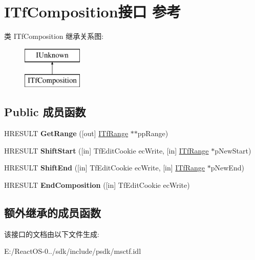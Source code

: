\hypertarget{interface_i_tf_composition}{}\section{I\+Tf\+Composition接口 参考}
\label{interface_i_tf_composition}
类 I\+Tf\+Composition 继承关系图\+:\begin{figure}[H]
\begin{center}
\leavevmode
\includegraphics[height=2.000000cm]{interface_i_tf_composition}
\end{center}
\end{figure}
\subsection*{Public 成员函数}
\begin{DoxyCompactItemize}
\item 
\mbox{\label{interface_i_tf_composition_a551b584852506041e51e85ebc2d7ff56}} 
H\+R\+E\+S\+U\+LT {\bfseries Get\+Range} (\mbox{[}out\mbox{]} \hyperlink{interface_i_tf_range}{I\+Tf\+Range} $\ast$$\ast$pp\+Range)
\item 
\mbox{\label{interface_i_tf_composition_ae173be887b35723dbeda8e56d3cb5d44}} 
H\+R\+E\+S\+U\+LT {\bfseries Shift\+Start} (\mbox{[}in\mbox{]} Tf\+Edit\+Cookie ec\+Write, \mbox{[}in\mbox{]} \hyperlink{interface_i_tf_range}{I\+Tf\+Range} $\ast$p\+New\+Start)
\item 
\mbox{\label{interface_i_tf_composition_ac9d8c954b5271790f3da7d676ff4da47}} 
H\+R\+E\+S\+U\+LT {\bfseries Shift\+End} (\mbox{[}in\mbox{]} Tf\+Edit\+Cookie ec\+Write, \mbox{[}in\mbox{]} \hyperlink{interface_i_tf_range}{I\+Tf\+Range} $\ast$p\+New\+End)
\item 
\mbox{\label{interface_i_tf_composition_aea1a5954fb1d6028878f499dc442277f}} 
H\+R\+E\+S\+U\+LT {\bfseries End\+Composition} (\mbox{[}in\mbox{]} Tf\+Edit\+Cookie ec\+Write)
\end{DoxyCompactItemize}
\subsection*{额外继承的成员函数}


该接口的文档由以下文件生成\+:\begin{DoxyCompactItemize}
\item 
E\+:/\+React\+O\+S-\/0../sdk/include/psdk/msctf.\+idl\end{DoxyCompactItemize}
